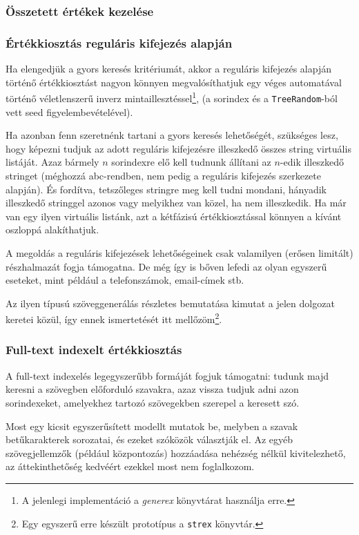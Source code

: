 \documentclass[
    parspace, %
    noindent, %
]{elteiktdk}[2023/10/30]
\begin{document}
\subsubsection{Összetett értékek kezelése}

\subsubsection{Értékkiosztás reguláris kifejezés alapján}

Ha elengedjük a gyors keresés kritériumát,
akkor a reguláris kifejezés alapján történő értékkiosztást nagyon könnyen megvalósíthatjuk
egy véges automatával történő véletlenszerű inverz mintaillesztéssel\footnote{
  A jelenlegi implementáció a \textit{generex} könyvtárat használja erre.
},
(a sorindex és a \texttt{TreeRandom}-ból vett seed figyelembevételével).

Ha azonban fenn szeretnénk tartani a gyors keresés lehetőségét,
szükséges lesz, hogy képezni tudjuk az adott reguláris kifejezésre illeszkedő összes string virtuális listáját.
Azaz bármely $n$ sorindexre elő kell tudnunk állítani az $n$-edik illeszkedő stringet
(méghozzá abc-rendben, nem pedig a reguláris kifejezés szerkezete alapján).
És fordítva, tetszőleges stringre meg kell tudni mondani,
hányadik illeszkedő stringgel azonos vagy melyikhez van közel, ha nem illeszkedik.
Ha már van egy ilyen virtuális listánk, azt a kétfázisú értékkiosztással könnyen a kívánt oszloppá alakíthatjuk.

A megoldás a reguláris kifejezések lehetőségeinek csak valamilyen (erősen limitált) részhalmazát fogja támogatna.
De még így is bőven lefedi az olyan egyszerű eseteket, mint például a telefonszámok, email-címek stb.

Az ilyen típusú szöveggenerálás részletes bemutatása kimutat a jelen dolgozat keretei közül,
így ennek ismertetését itt mellőzöm\footnote{
  Egy egyszerű erre készült prototípus a \texttt{strex} könyvtár.
}.

\subsubsection{Full-text indexelt értékkiosztás}

A full-text indexelés legegyszerűbb formáját fogjuk támogatni:
tudunk majd keresni a szövegben előforduló szavakra,
azaz vissza tudjuk adni azon sorindexeket,
amelyekhez tartozó szövegekben szerepel a keresett szó.

Most egy kicsit egyszerűsített modellt mutatok be,
melyben a szavak betűkarakterek sorozatai,
és ezeket szóközök választják el.
Az egyéb szövegjellemzők (például központozás) hozzáadása nehézség nélkül kivitelezhető,
az áttekinthetőség kedvéért ezekkel most nem foglalkozom.
\end{document}
